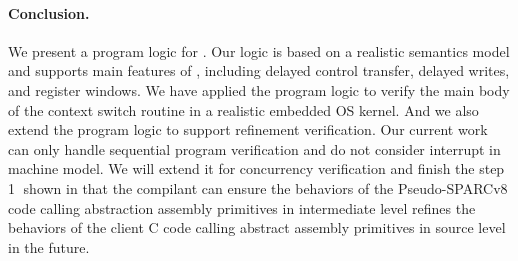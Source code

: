 \paragraph{\textbf{Conclusion.}}
We present a program logic for \sparc.
Our logic is based on a realistic semantics
model and supports main features of \sparc,
including delayed control transfer, delayed writes,
and register windows.
We have applied the program logic to verify
the main body of the context switch routine
in a realistic embedded OS kernel. 
And we also extend the program logic to support 
refinement verification. 
Our current work can only handle
sequential \sparc{} program verification and 
do not consider interrupt in machine model.  
We will extend it for concurrency verification 
and finish the step {\color{blue} \textcircled{1}} shown in
\Fig{\ref{fig:idea to establish contextual refinement}}
that the compilant can ensure the behaviors 
of the Pseudo-SPARCv8 code calling abstraction assembly 
primitives in intermediate level refines 
the behaviors of 
the client C code calling abstract assembly primitives 
in source level in the future. 
